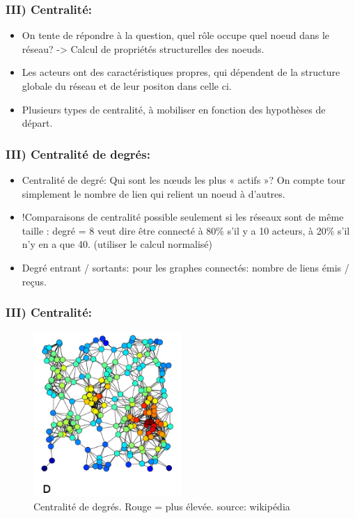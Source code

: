 \documentclass{beamer}
\begin{document}
\begin{frame}
    \frametitle{III) Centralité:}
    \begin{itemize}
        \item On tente de répondre à la question, quel rôle occupe quel noeud dans le réseau? -> Calcul de propriétés structurelles des noeuds.
        \item Les acteurs ont des caractéristiques propres, qui dépendent de la structure globale du réseau et de leur positon dans celle ci.
        \item Plusieurs types de centralité, à mobiliser en fonction des hypothèses de départ.
    \end{itemize}
\end{frame}

\begin{frame}
    \frametitle{III) Centralité de degrés:}
    \begin{itemize}
        \item Centralité de degré: Qui sont les nœuds les plus « actifs »? On compte tour simplement le nombre de lien qui relient un noeud à d'autres.
        \item !Comparaisons de centralité possible seulement si les réseaux sont de même taille : degré = 8 veut dire être connecté à 80\% s’il y a 10 acteurs, à 20\% s’il n’y en a que 40. (utiliser le calcul normalisé)
        \item Degré entrant / sortants: pour les graphes connectés: nombre de liens émis / reçus.
    \end{itemize}
\end{frame}

\begin{frame}
    \frametitle{III) Centralité:}
    \begin{figure}
        \centering
        \includegraphics[width = 0.5\textwidth]{degres.png}
        \caption{\small{Centralité de degrés. Rouge = plus élevée. source: wikipédia}}
      \end{figure}
\end{frame}
\end{document}
